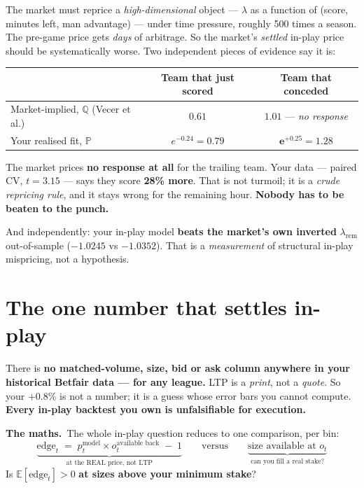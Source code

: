 \documentclass[11pt,a4paper]{article}
\newcommand{\formula}[1]{\smallskip\noindent\textbf{\small The maths.}\ #1}
\begin{document}
The market must reprice a \emph{high-dimensional} object --- $\lambda$ as a function of (score, minutes left,
man advantage) --- under time pressure, roughly 500 times a season. The pre-game price gets \emph{days} of
arbitrage. So the market's \emph{settled} in-play price should be systematically worse. Two independent
pieces of evidence say it is:

\begin{center}
\begin{tabular}{@{}lcc@{}}
\toprule
& Team that just scored & Team that conceded \\
\midrule
Market-implied, $\mathbb{Q}$ (Vecer et al.) & $0.61$ & $\mathbf{1.01}$ --- \emph{no response} \\
Your realised fit, $\mathbb{P}$ & $e^{-0.24} = 0.79$ & $\mathbf{e^{+0.25} = 1.28}$ \\
\bottomrule
\end{tabular}
\end{center}

\noindent
The market prices \textbf{no response at all} for the trailing team. Your data --- paired CV, $t = 3.15$ ---
says they score \textbf{28\% more}. That is not turmoil; it is a \emph{crude repricing rule}, and it stays
wrong for the remaining hour. \textbf{Nobody has to be beaten to the punch.}

\smallskip
And independently: your in-play model \textbf{beats the market's own inverted} $\lambda_{\text{rem}}$
out-of-sample ($-1.0245$ vs $-1.0352$). That is a \emph{measurement} of structural in-play mispricing, not a
hypothesis.

\section{The one number that settles in-play}

\begin{gapbox}[title={YOU CANNOT CURRENTLY COMPUTE IT}]
There is \textbf{no matched-volume, size, bid or ask column anywhere in your historical Betfair data --- for
any league.} LTP is a \emph{print}, not a \emph{quote}. So your $+0.8\%$ is not a number; it is a guess whose
error bars you cannot compute. \textbf{Every in-play backtest you own is unfalsifiable for execution.}
\end{gapbox}

\formula{The whole in-play question reduces to one comparison, per bin:
\[
  \boxed{\;
  \underbrace{\mathrm{edge}_t \;=\; p^{\text{model}}_t \times o^{\text{available back}}_t \;-\; 1}_{\text{at the REAL price, not LTP}}
  \qquad\text{versus}\qquad
  \underbrace{\text{size available at } o_t}_{\text{can you fill a real stake?}}
  \;}
\]
Is $\mathbb{E}[\mathrm{edge}_t] > 0$ \textbf{at sizes above your minimum stake}?}
\end{document}
